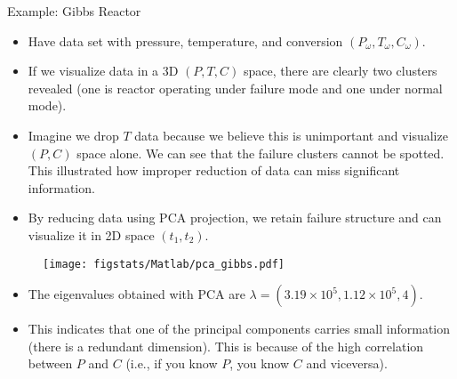 \documentclass[9pt]{beamer}
\begin{document}
%
\begin{frame}{Example: Gibbs Reactor}

\begin{itemize}
\item Have data set with pressure, temperature, and conversion $(P_\omega,T_\omega,C_\omega)$.
\item If we visualize data in a 3D $(P,T,C)$ space, there are clearly two clusters revealed (one is reactor operating under failure mode and one under normal mode).
\item Imagine we drop $T$ data because we believe this is unimportant and visualize $(P,C)$ space alone. We can see that the  failure clusters cannot be spotted. This illustrated how improper reduction of data can miss significant information. 
\item By reducing data using PCA projection, we retain failure structure and can visualize it in 2D space $(t_1,t_2)$.
\end{itemize}

\begin{figure}[!htb]
    \centering
	\texttt{[image: figstats/Matlab/pca\_gibbs.pdf]}
\end{figure}

\begin{itemize}
\item The eigenvalues obtained with PCA are $\lambda=(3.19\times 10^5,1.12\times 10^5,4)$. 
\item This indicates that one of the principal components carries small information (there is a redundant dimension). This is because of the high correlation between $P$ and $C$ (i.e., if you know $P$, you know $C$ and viceversa). 
\end{itemize}


\end{frame}
\end{document}
